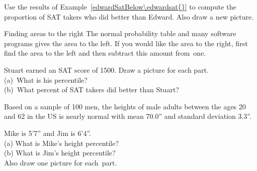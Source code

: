 \begin{exercisewrap}
\begin{nexercise}
Use the results of Example~\ref{edwardSatBelow\edwardsat{}}
to compute the proportion of SAT takers who did better than
Edward.
Also draw a new picture.\footnotemark{}
\end{nexercise}
\end{exercisewrap}

\begin{onebox}{Finding areas to the right}
  The normal probability table and many software programs
  gives the area to the left.
  If you would like the area to the right, first find the
  area to the left and then subtract this amount from~one.
\end{onebox}

\newcommand{\stuartsat}{1500}
\newcommand{\stuarsatz}{2}
\begin{exercisewrap}
\begin{nexercise}
Stuart earned an SAT score of \stuartsat{}.
Draw a picture for each part. \\
(a)~What is his percentile? \\
(b)~What percent of SAT takers did better than
Stuart?\footnotemark{}
\end{nexercise}
\end{exercisewrap}

Based on a sample of 100 men, the heights of male adults
between the ages 20 and 62 in the US is nearly normal with
mean 70.0'' and standard deviation 3.3''.

\begin{exercisewrap}
\begin{nexercise}
Mike is 5'7'' and Jim is 6'4''. \\
(a) What is Mike's height percentile? \\
(b) What is Jim's height percentile? \\
Also draw one picture for each~part.\footnotemark{}
\end{nexercise}
\end{exercisewrap}

